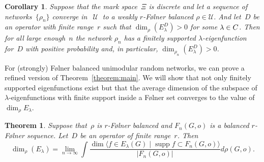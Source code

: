 \documentclass[10pt,a4paper]{amsart}
\newtheorem{corollary}[lemma]{Corollary}
\newtheorem{theorem}[lemma]{Theorem}
\DeclareMathOperator{\supp}{supp}%
\DeclareMathOperator{\U}{{\mathcal{U}}}
\newcommand*{\field}[1]{\mathbf{#1}} %
\newcommand*\C{\field{C}} %
\begin{document}
\begin{corollary}\label{corollary:sofic1}
    Suppose that the mark space~$\Xi$ is discrete and let a sequence of networks~$\{\rho_n\}$  converge in~$\U$ to a weakly $r$-{F\o lner} balanced $\rho \in \mathcal{U}$. And let~$D$ be an operator with finite range~$r$ such that $\dim_\rho (E^D_\lambda) > 0$ for some $\lambda \in \mathbb \C$. Then for all large enough~$n$ the network $\rho_n$ has a finitely supported $\lambda$-eigenfunction for~$D$ with positive probability and, in particular, $\dim_{\rho_n}(E^D_\lambda)> 0$. 
\end{corollary}


For (strongly) {F\o lner} balanced unimodular random networks, we can prove a refined version of Theorem~\ref{theorem:main}. We will show that not only finitely supported eigenfunctions exist but that the average dimension of the subspace of $\lambda$-eigenfunctions with finite support inside a F\o lner set converges to the value of~$\dim_\rho E_\lambda$. 

\begin{theorem}\label{theorem:balanced}
    Suppose that~$\rho$ is $r$-{F\o lner} balanced and $F_n(G,o)$ is a balanced $r$-F\o lner sequence. Let~$D$ be an operator of finite range~$r$. Then 
    $$
    \dim_\rho(E_\lambda) = \lim_{n \to \infty}\int \frac{ \dim \langle f \in E_\lambda(G) \mid \supp f \subset F_n(G,o)\rangle}{|F_n(G,o)|} d\rho(G,o).
    $$
\end{theorem}
\end{document}
